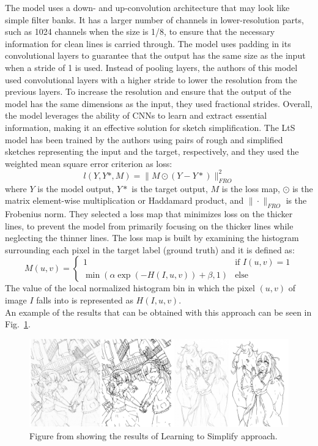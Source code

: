 \noindent The model uses a down- and up-convolution architecture that may look like simple filter banks. It has a larger number of channels in lower-resolution parts, such as \num{1024} channels when the size is \num{1}/\num{8}, to ensure that the necessary information for clean lines is carried through. The model uses padding in its convolutional layers to guarantee that the output has the same size as the input when a stride of \num{1} is used. Instead of pooling layers, the authors of this model used convolutional layers with a higher stride to lower the resolution from the previous layers. To increase the resolution and ensure that the output of the model has the same dimensions as the input, they used fractional strides.
Overall, the model leverages the ability of CNNs to learn and extract essential information, making it an effective solution for sketch simplification.
The LtS model has been trained by the authors using pairs of rough and simplified sketches representing the input and the target, respectively, and they used the weighted mean square error criterion as loss:
\begin{equation}
    l(Y,Y*,M)=\|M \odot (Y-Y*)\|^2_{FRO}
\end{equation}
where $Y$ is the model output, $Y*$ is the target output, $M$ is the loss map,  $\odot$ is the matrix element-wise multiplication or Haddamard product, and $\| \cdot \|_{FRO}$ is the Frobenius norm. They selected a loss map that minimizes loss on the thicker lines, to prevent the model from primarily focusing on the thicker lines while neglecting the thinner lines. The loss map is built by examining the histogram surrounding each pixel in the target label (ground truth) and it is  defined as:
\begin{equation}
    M(u,v) = 
    \begin{cases}
        1 & \text{if } I(u,v)=1\\
        \min (\alpha \exp (-H(I,u,v)) + \beta, 1) & \text{else}
    \end{cases}
\end{equation}
The value of the local normalized histogram bin in which the pixel $(u,v)$ of image $I$ falls into is represented as $H(I,u,v)$.\\
An example of the results that can be obtained with this approach can be seen in Fig.~\ref{fig:Learning to Simplify results}.
%
\begin{figure}[htbp]
\centering
  \includegraphics[scale=0.35]{figures/learnToSimplify-results-paper.png}
  \caption{Figure from \cite{SketchSimplify} showing the results of Learning to Simplify approach.}
  \label{fig:Learning to Simplify results}
\end{figure}
%
